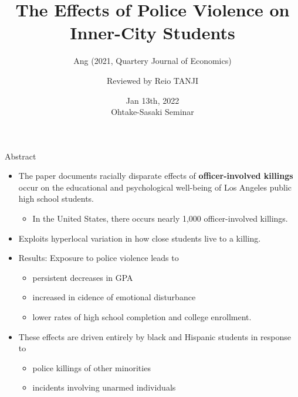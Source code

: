 \documentclass[dvipdfmx,11pt]{beamer}
\title[Ang (2021, QJE)]{The Effects of Police Violence on Inner-City Students}
\subtitle{Ang (2021, Quartery Journal of Economics)}
\author[Reviewed by R.TANJI]{Reviewed by Reio TANJI}
\date{Jan 13th, 2022 \\ Ohtake-Sasaki Seminar}
\institute[]{Osaka University, Graduate School of Economics}
\begin{document}
\begin{frame}\frametitle{}
\titlepage
\end{frame}

\begin{frame}{Abstract}
  \begin{itemize}
    \item The paper documents racially disparate effects of \textbf{officer-involved killings} occur on the educational and psychological well-being of Los Angeles public high school students.
    \begin{itemize}
      \item In the United States, there occurs nearly 1,000 officer-involved killings.
    \end{itemize}
    \item Exploits hyperlocal variation in how close students live to a killing.
    \item Results: Exposure to police violence leads to
    \begin{itemize}
      \item persistent decreases in GPA
      \item increased in cidence of emotional disturbance
      \item lower rates of high school completion and college enrollment.
    \end{itemize}
    \item These effects are driven entirely by black and Hispanic students in response to
    \begin{itemize}
      \item police killings of other minorities
      \item incidents involving unarmed individuals
    \end{itemize}
  \end{itemize}
\end{frame}
\end{document}
